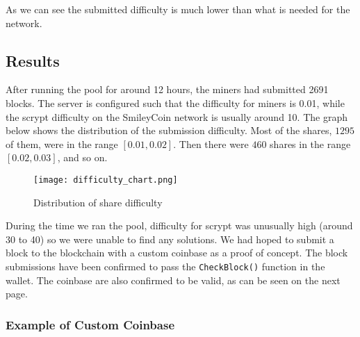 As we can see the submitted difficulty is much lower than what is needed for the network. 

\subsection{Results}

After running the pool for around 12 hours, the miners had submitted 2691 blocks. The server is configured such that the difficulty for miners is 0.01, while the scrypt difficulty on the SmileyCoin network is usually around 10. The graph below shows the distribution of the submission difficulty. Most of the shares, $1295$ of them, were in the range $[0.01, 0.02]$. Then there were $460$ shares in the range $[0.02,0.03]$, and so on.

\begin{figure}[h]
    \centering
    \texttt{[image: difficulty\_chart.png]}
    \caption{Distribution of share difficulty}
\end{figure}

During the time we ran the pool, difficulty for scrypt was unusually high (around 30 to 40) so we were unable to find any solutions. We had hoped to submit a block to the blockchain with a custom coinbase as a proof of concept. The block submissions have been confirmed to pass the \texttt{CheckBlock()} function in the wallet. The coinbase are also confirmed to be valid, as can be seen on the next page.

\subsubsection{Example of Custom Coinbase}

